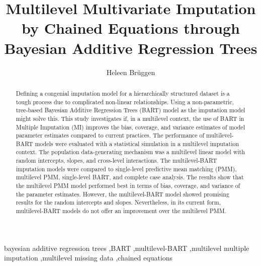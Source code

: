\documentclass[3p,12pt,a4paper]{elsarticle}
\begin{document}
\begin{frontmatter}
\title{Multilevel Multivariate Imputation by Chained Equations through Bayesian Additive Regression Trees}

\author[1]{Heleen Brüggen}



\begin{abstract} %
    Defining a congenial imputation model for a hierarchically structured dataset is a tough process due to complicated non-linear relationships. Using a non-parametric, tree-based Bayesian Additive Regression Trees (BART) model as the imputation model might solve this. This study investigates if, in a multilevel context, the use of BART in Multiple Imputation (MI) improves the bias, coverage, and variance estimates of model parameter estimates compared to current practices. The performance of multilevel-BART models were evaluated with a statistical simulation in a multilevel imputation context. The population data-generating mechanism was a multilevel linear model with random intercepts, slopes, and cross-level interactions. The multilevel-BART imputation models were compared to single-level predictive mean matching (PMM), multilevel PMM, single-level BART, and complete case analysis. The results show that the multilevel PMM model performed best in terms of bias, coverage, and variance of the parameter estimates. However, the multilevel-BART model showed promising results for the random intercepts and slopes. Nevertheless, in its current form, multilevel-BART models do not offer an improvement over the multilevel PMM.
\end{abstract}

\begin{keyword} %
    bayesian additive regression trees \sep BART \sep multilevel-BART \sep multilevel multiple imputation \sep multilevel missing data \sep chained equations
\end{keyword}
\end{frontmatter}
\end{document}
